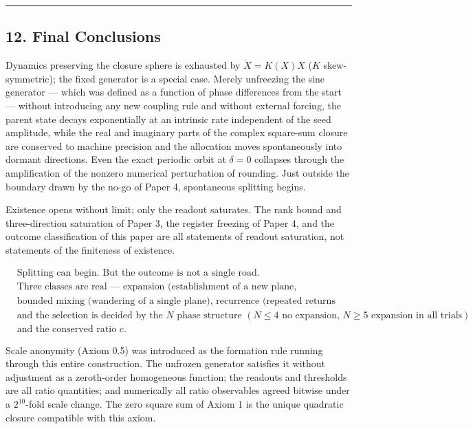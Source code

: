 \documentclass[
  a4paper,
]{article}
\begin{document}
\begin{center}\rule{0.5\linewidth}{0.5pt}\end{center}

\subsection{12. Final Conclusions}\label{final-conclusions}

Dynamics preserving the closure sphere is exhausted by \(\dot X=K(X)X\)
(\(K\) skew-symmetric); the fixed generator is a special case. Merely
unfreezing the sine generator --- which was defined as a function of
phase differences from the start --- without introducing any new
coupling rule and without external forcing, the parent state decays
exponentially at an intrinsic rate independent of the seed amplitude,
while the real and imaginary parts of the complex square-sum closure are
conserved to machine precision and the allocation moves spontaneously
into dormant directions. Even the exact periodic orbit at \(\delta=0\)
collapses through the amplification of the nonzero numerical
perturbation of rounding. Just outside the boundary drawn by the no-go
of Paper 4, spontaneous splitting begins.

Existence opens without limit; only the readout saturates. The rank
bound and three-direction saturation of Paper 3, the register freezing
of Paper 4, and the outcome classification of this paper are all
statements of readout saturation, not statements of the finiteness of
existence.

\[
\boxed{
\begin{aligned}
&\text{Splitting can begin. But the outcome is not a single road.}\\
&\text{Three classes are real — expansion (establishment of a new plane, equipartition),}\\
&\text{bounded mixing (wandering of a single plane), recurrence (repeated returns toward the parent) —}\\
&\text{and the selection is decided by the }N\text{ phase structure }(N\le4\text{ no expansion, }N\ge5\text{ expansion in all trials})\\
&\text{and the conserved ratio }c.
\end{aligned}
}
\]

Scale anonymity (Axiom 0.5) was introduced as the formation rule running
through this entire construction. The unfrozen generator satisfies it
without adjustment as a zeroth-order homogeneous function; the readouts
and thresholds are all ratio quantities; and numerically all ratio
observables agreed bitwise under a \(2^{10}\)-fold scale change. The
zero square sum of Axiom 1 is the unique quadratic closure compatible
with this axiom.
\end{document}
